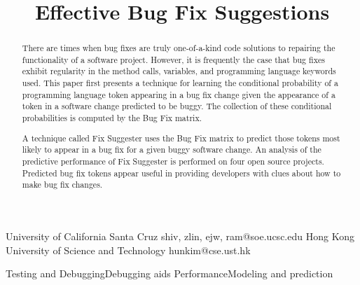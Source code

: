 \documentclass[journal,10pt,draftclsnofoot,twocolumn]{IEEEtran}
\begin{document}
\title{Effective Bug Fix Suggestions}


		 {University of California Santa Cruz}
		 {{shiv, zlin, ejw, ram}@soe.ucsc.edu}
		 {Hong Kong University of Science and Technology}
		 {hunkim@cse.ust.hk}
		
\maketitle

\begin{abstract}

There are times when bug fixes are truly one-of-a-kind code solutions to repairing the functionality of a software project. However, it is frequently the case that bug fixes exhibit regularity in the method calls, variables, and programming language keywords used. This paper first presents a technique for learning the conditional probability of a programming language token appearing in a bug fix change given the appearance of a token in a software change predicted to be buggy. The collection of these conditional probabilities is computed by the Bug Fix matrix.

A technique called Fix Suggester uses the Bug Fix matrix to predict those tokens most likely to appear in a bug fix for a given buggy software change. An analysis of the predictive performance of Fix Suggester is performed on four open source projects. Predicted bug fix tokens appear useful in providing developers with clues about how to make bug fix changes.

\end{abstract}
 {Testing and Debugging}{Debugging aids}
 {Performance}{Modeling and prediction}
\end{document}
